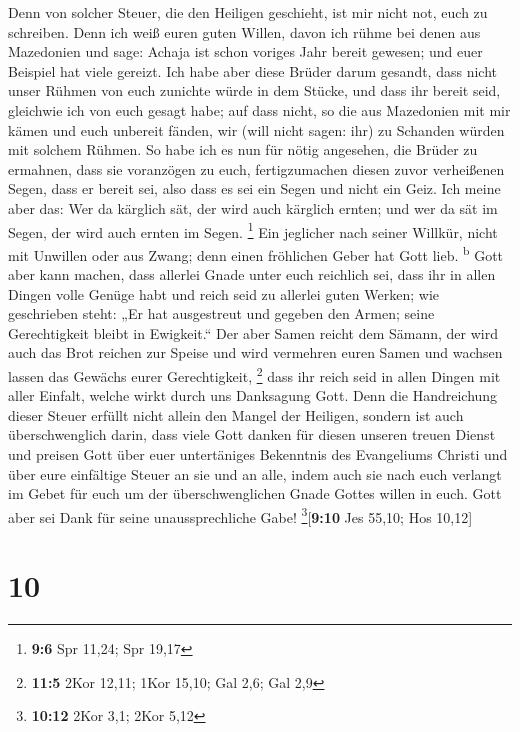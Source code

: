  Denn von solcher Steuer, die den Heiligen geschieht, ist
mir nicht not, euch zu schreiben.  Denn ich weiß euren
guten Willen, davon ich rühme bei denen aus Mazedonien und sage: Achaja
ist schon voriges Jahr bereit gewesen; und euer Beispiel hat viele
gereizt.  Ich habe aber diese Brüder darum gesandt, dass
nicht unser Rühmen von euch zunichte würde in dem Stücke, und dass ihr
bereit seid, gleichwie ich von euch gesagt habe;  auf dass
nicht, so die aus Mazedonien mit mir kämen und euch unbereit fänden, wir
(will nicht sagen: ihr) zu Schanden würden mit solchem Rühmen.
 So habe ich es nun für nötig angesehen, die Brüder zu
ermahnen, dass sie voranzögen zu euch, fertigzumachen diesen zuvor
verheißenen Segen, dass er bereit sei, also dass es sei ein Segen und
nicht ein Geiz.  Ich meine aber das: Wer da kärglich sät,
der wird auch kärglich ernten; und wer da sät im Segen, der wird auch
ernten im Segen. \footnote{\textbf{9:6} Spr 11,24; Spr 19,17}
 Ein jeglicher nach seiner Willkür, nicht mit Unwillen
oder aus Zwang; denn einen fröhlichen Geber hat Gott lieb.
\textsuperscript{b}  Gott aber kann machen, dass allerlei
Gnade unter euch reichlich sei, dass ihr in allen Dingen volle Genüge
habt und reich seid zu allerlei guten Werken;  wie
geschrieben steht: „Er hat ausgestreut und gegeben den Armen; seine
Gerechtigkeit bleibt in Ewigkeit.``  Der aber Samen
reicht dem Sämann, der wird auch das Brot reichen zur Speise und wird
vermehren euren Samen und wachsen lassen das Gewächs eurer
Gerechtigkeit, \footnote{\textbf{11:5} 2Kor 12,11; 1Kor 15,10; Gal 2,6;
  Gal 2,9}  dass ihr reich seid in allen Dingen mit aller
Einfalt, welche wirkt durch uns Danksagung Gott.  Denn
die Handreichung dieser Steuer erfüllt nicht allein den Mangel der
Heiligen, sondern ist auch überschwenglich darin, dass viele Gott danken
für diesen unseren treuen Dienst  und preisen Gott über
euer untertäniges Bekenntnis des Evangeliums Christi und über eure
einfältige Steuer an sie und an alle,  indem auch sie
nach euch verlangt im Gebet für euch um der überschwenglichen Gnade
Gottes willen in euch.  Gott aber sei Dank für seine
unaussprechliche Gabe! \footnote{\textbf{10:12} 2Kor 3,1; 2Kor 5,12}{[}\textbf{9:10}
Jes 55,10; Hos 10,12{]}

\hypertarget{section-9}{%
\section{10}\label{section-9}}

